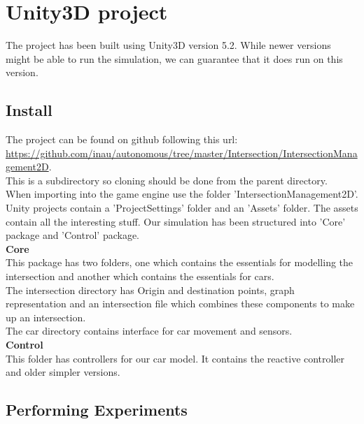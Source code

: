 \section{Unity3D project}
The project has been built using Unity3D version 5.2.
While newer versions might be able to run the simulation, we can guarantee that it does run on this version.\\

\subsection{Install}
The project can be found on github following this url: \url{https://github.com/inau/autonomous/tree/master/Intersection/IntersectionManagement2D}.\\
This is a subdirectory so cloning should be done from the parent directory.\\
When importing into the game engine use the folder 'IntersectionManagement2D'.\\

\noindent
Unity projects contain a 'ProjectSettings' folder and an 'Assets' folder. The assets contain all the interesting stuff.
Our simulation has been structured into 'Core' package and 'Control' package.\\

\noindent
\textbf{Core}\\
\noindent
This package has two folders, one which contains the essentials for modelling the intersection and another which contains the essentials for cars.\\
The intersection directory has Origin and destination points, graph representation and an intersection file which combines these components to make up an intersection.\\
The car directory contains interface for car movement and sensors.\\

\noindent
\textbf{Control}\\
This folder has controllers for our car model. It contains the reactive controller and older simpler versions.

\subsection{Performing Experiments}
